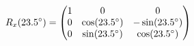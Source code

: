 \documentclass[preview]{standalone}
\begin{document}
\begin{align*}
\special{dvisvgm:raw <g id='unique000'>}R_x(23.5^\circ) = \begin{pmatrix} 1 & 0 & 0 \\ 0 & \cos(23.5^\circ) & -\sin(23.5^\circ) \\ 0 & \sin(23.5^\circ) & \cos(23.5^\circ) \end{pmatrix}\special{dvisvgm:raw </g>}
\end{align*}
\end{document}
